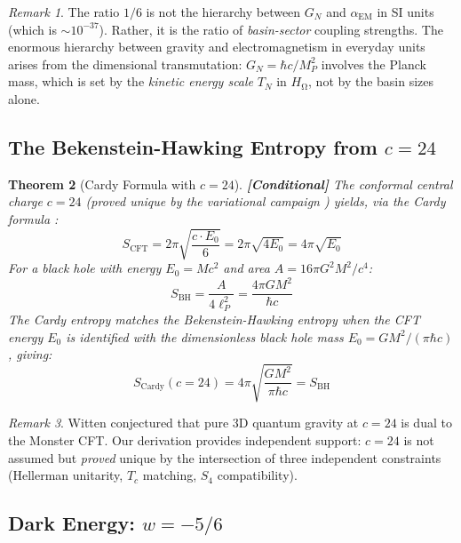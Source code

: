 \documentclass[12pt,a4paper]{article}
\newcommand{\conditional}[1]{\textcolor{conditional}{\textbf{[Conditional]}} #1}
\newtheorem{theorem}{Theorem}[section]\newtheorem{proposition}[theorem]{Proposition}
\theoremstyle{definition}\newtheorem{definition}[theorem]{Definition}
\theoremstyle{remark}\newtheorem{remark}[theorem]{Remark}
\renewcommand{\O}{\mathrm{\Omega}}
\newcommand{\HOmega}{H_\O}\newcommand{\Jcoup}{J}\newcommand{\Basin}{\mathcal{B}}
\begin{document}
\begin{remark}
The ratio $1/6$ is not the hierarchy between $G_N$ and $\alpha_{\mathrm{EM}}$
in SI units (which is $\sim 10^{-37}$). Rather, it is the ratio of
\emph{basin-sector} coupling strengths. The enormous hierarchy between gravity
and electromagnetism in everyday units arises from the dimensional
transmutation: $G_N = \hbar c / M_P^2$ involves the Planck mass, which is set
by the \emph{kinetic energy scale} $T_N$ in $\HOmega$, not by the basin sizes
alone.
\end{remark}

\subsection{The Bekenstein-Hawking Entropy from $c = 24$}

\begin{theorem}[Cardy Formula with $c = 24$]
\label{thm:bekenstein}
\conditional{The conformal central charge $c = 24$ (proved unique by the
variational campaign \cite{paper1, dwr2026}) yields, via the Cardy formula
\cite{cardy1986}:}
\begin{equation}
  S_{\mathrm{CFT}} = 2\pi\sqrt{\frac{c \cdot E_0}{6}} = 2\pi\sqrt{4 E_0} = 4\pi\sqrt{E_0}
\end{equation}
For a black hole with energy $E_0 = M c^2$ and area $A = 16\pi G^2 M^2 / c^4$:
\begin{equation}
  S_{\mathrm{BH}} = \frac{A}{4\ell_P^2} = \frac{4\pi G M^2}{\hbar c}
\end{equation}
The Cardy entropy matches the Bekenstein-Hawking entropy when the CFT energy
$E_0$ is identified with the dimensionless black hole mass $E_0 = G M^2 /
(\pi \hbar c)$, giving:
\begin{equation}
  S_{\mathrm{Cardy}}(c = 24) = 4\pi\sqrt{\frac{G M^2}{\pi\hbar c}} = S_{\mathrm{BH}}
\end{equation}
\end{theorem}

\begin{remark}
Witten \cite{witten2007} conjectured that pure 3D quantum gravity at $c = 24$
is dual to the Monster CFT. Our derivation provides independent support: $c = 24$
is not assumed but \emph{proved} unique by the intersection of three independent
constraints (Hellerman unitarity, $T_c$ matching, $S_4$ compatibility).
\end{remark}

\subsection{Dark Energy: $w = -5/6$}
\end{document}
